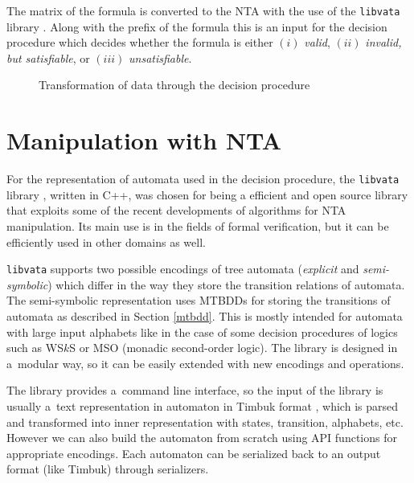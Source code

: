 The matrix of the formula is converted to the NTA
with the use of the \texttt{libvata} library
\cite{vata-tool}.
Along with the prefix of the formula this is an input for the decision procedure
which decides whether the formula is either $(i)$ \emph{valid}, $(ii)$
\emph{invalid, but satisfiable}, or $(iii)$ \emph{unsatisfiable}.

\begin{figure}[hb]
\begin{center}
 \caption{Transformation of data through the decision procedure}\label{flow}
 \end{center}
\end{figure}

\section{Manipulation with NTA}

For the representation of automata used in the decision procedure, the
\texttt{libvata} library \cite{vata-tool}, written in C++, was chosen for being
a efficient and open source library that exploits some of the recent
developments of algorithms for NTA manipulation. Its main use is in the fields
of formal verification, but it can be efficiently used in other domains as well.

\texttt{libvata} supports two possible encodings of tree automata
(\emph{explicit} and \emph{semi-symbolic}) which differ in the way they store
the transition relations of automata. The semi-symbolic representation uses
MTBDDs for storing the transitions of automata as described in Section
\ref{mtbdd}. This is mostly intended for automata with large input alphabets
like in the case of some decision procedures of logics such as WS$k$S
\cite{mona} or MSO \cite{mso} (monadic second-order logic). The library is
designed in a~modular way, so it can be easily extended with new encodings and operations.

The library provides a~command line interface, so the input of the library is
usually a~text representation in automaton in Timbuk format \cite{timbuk}, which
is parsed and transformed into inner representation with states, transition,
alphabets, etc. However we can also build the automaton from scratch using API
functions for appropriate encodings. Each automaton can be serialized back to an
output format (like Timbuk) through serializers.

